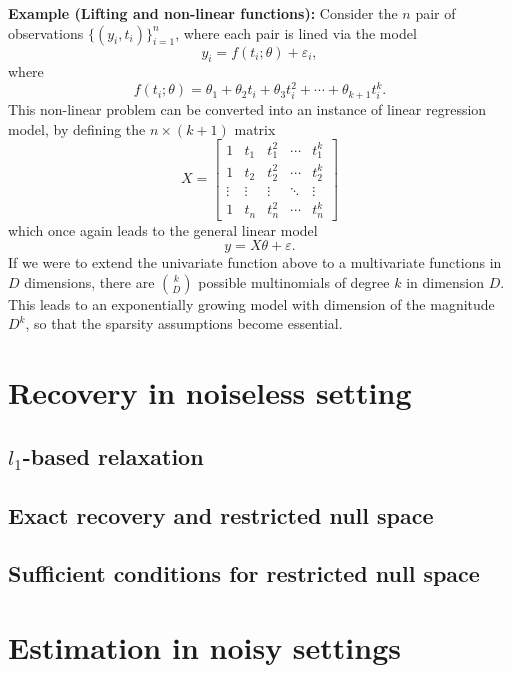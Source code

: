 \documentclass[10pt,handout,english]{beamer}
\begin{document}
\begin{frame}[allowframebreaks]
\textbf{Example (Lifting and non-linear functions):} Consider the $n$ pair of observations $\{(y_i,t_i)\}_{i=1}^n$, where each pair is lined via the model 
\[
y_i=f(t_i;\theta)+\varepsilon_i,
\]
where 
\[
f(t_i;\theta)=\theta_1+\theta_2t_i+\theta_3t_i^2+\cdots+\theta_{k+1}t_i^k.
\]
This non-linear problem can be converted into an instance of linear regression model, by defining the $n\times(k+1)$ matrix
\[
X=
\begin{bmatrix}
1&t_1&t_1^2&\cdots&t_1^k\\
1&t_2&t_2^2&\cdots&t_2^k\\
\vdots&\vdots&\vdots&\ddots&\vdots\\
1&t_n&t_n^2&\cdots&t_n^k
\end{bmatrix}
\]
which once again leads to the general linear model
\[
y=X\theta+\varepsilon.
\]
If we were to extend the univariate function above to a multivariate functions in  $D$ dimensions, there are $\binom{k}{D}$ possible multinomials of degree $k$ in dimension $D$. This leads to an exponentially growing model with dimension of the magnitude $D^k$, so that the sparsity assumptions become essential.
\end{frame}

\begin{frame}[allowframebreaks]

\end{frame}

\section{Recovery in noiseless setting}
\subsection{$l_1$-based relaxation}


\subsection{Exact recovery and restricted null space}


\subsection{Sufficient conditions for restricted null space}


\section{Estimation in noisy settings}
\end{document}

